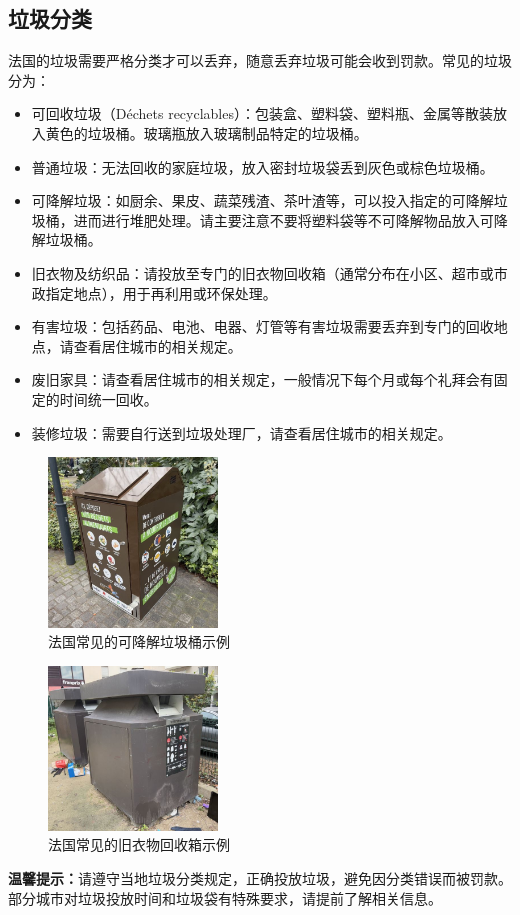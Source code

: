 \subsection{垃圾分类}

法国的垃圾需要严格分类才可以丢弃，随意丢弃垃圾可能会收到罚款。常见的垃圾分为：

\begin{itemize}
    \item 可回收垃圾（Déchets recyclables）：包装盒、塑料袋、塑料瓶、金属等散装放入黄色的垃圾桶。玻璃瓶放入玻璃制品特定的垃圾桶。
    \item 普通垃圾：无法回收的家庭垃圾，放入密封垃圾袋丢到灰色或棕色垃圾桶。
    \item 可降解垃圾：如厨余、果皮、蔬菜残渣、茶叶渣等，可以投入指定的可降解垃圾桶，进而进行堆肥处理。请主要注意不要将塑料袋等不可降解物品放入可降解垃圾桶。
    \item 旧衣物及纺织品：请投放至专门的旧衣物回收箱（通常分布在小区、超市或市政指定地点），用于再利用或环保处理。
    \item 有害垃圾：包括药品、电池、电器、灯管等有害垃圾需要丢弃到专门的回收地点，请查看居住城市的相关规定。
    \item 废旧家具：请查看居住城市的相关规定，一般情况下每个月或每个礼拜会有固定的时间统一回收。
    \item 装修垃圾：需要自行送到垃圾处理厂，请查看居住城市的相关规定。
\end{itemize}

\begin{figure}[h]
    \centering
    \includegraphics[width=0.4\textwidth]{chapters/06_life/images/garbage_bin_biodegradable.jpg}
    \caption{法国常见的可降解垃圾桶示例}
\end{figure}

\begin{figure}[h]
    \centering
    \includegraphics[width=0.4\textwidth]{chapters/06_life/images/garbage_bin_clothes.jpg}
    \caption{法国常见的旧衣物回收箱示例}
\end{figure}

\textbf{温馨提示：}请遵守当地垃圾分类规定，正确投放垃圾，避免因分类错误而被罚款。部分城市对垃圾投放时间和垃圾袋有特殊要求，请提前了解相关信息。

